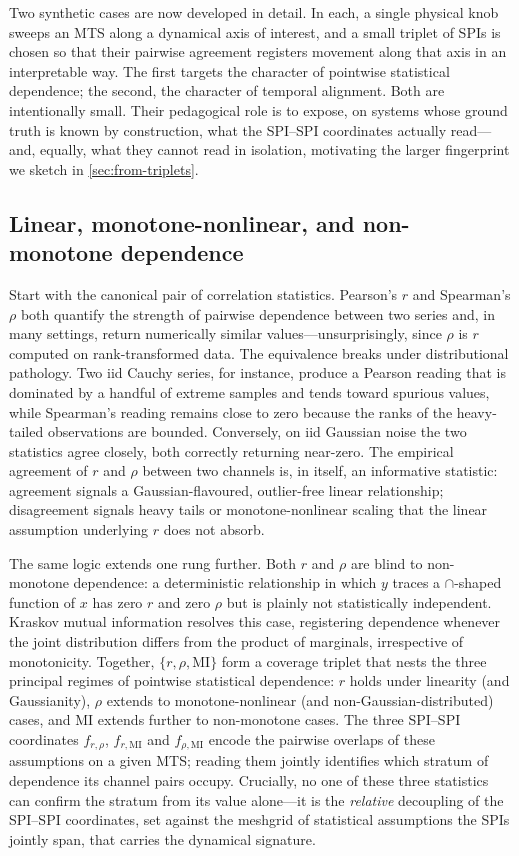 \documentclass{article}
\theoremstyle{plain}
\theoremstyle{definition}
\theoremstyle{remark}
\begin{document}
Two synthetic cases are now developed in detail. In each, a single physical knob sweeps an MTS along a dynamical axis of interest, and a small triplet of SPIs is chosen so that their pairwise agreement registers movement along that axis in an interpretable way. The first targets the character of pointwise statistical dependence; the second, the character of temporal alignment. Both are intentionally small. Their pedagogical role is to expose, on systems whose ground truth is known by construction, what the SPI--SPI coordinates actually read---and, equally, what they cannot read in isolation, motivating the larger fingerprint we sketch in \cref{sec:from-triplets}.

\subsection{Linear, monotone-nonlinear, and non-monotone dependence}
\label{sec:case-rho-mi}

Start with the canonical pair of correlation statistics. Pearson's $r$ and Spearman's $\rho$ both quantify the strength of pairwise dependence between two series and, in many settings, return numerically similar values---unsurprisingly, since $\rho$ is $r$ computed on rank-transformed data. The equivalence breaks under distributional pathology. Two iid Cauchy series, for instance, produce a Pearson reading that is dominated by a handful of extreme samples and tends toward spurious values, while Spearman's reading remains close to zero because the ranks of the heavy-tailed observations are bounded. Conversely, on iid Gaussian noise the two statistics agree closely, both correctly returning near-zero. The empirical agreement of $r$ and $\rho$ between two channels is, in itself, an informative statistic: agreement signals a Gaussian-flavoured, outlier-free linear relationship; disagreement signals heavy tails or monotone-nonlinear scaling that the linear assumption underlying $r$ does not absorb.

The same logic extends one rung further. Both $r$ and $\rho$ are blind to non-monotone dependence: a deterministic relationship in which $y$ traces a $\cap$-shaped function of $x$ has zero $r$ and zero $\rho$ but is plainly not statistically independent. Kraskov mutual information \citep{kraskov2004estimating} resolves this case, registering dependence whenever the joint distribution differs from the product of marginals, irrespective of monotonicity. Together, $\{r,\rho,\mathrm{MI}\}$ form a coverage triplet that nests the three principal regimes of pointwise statistical dependence: $r$ holds under linearity (and Gaussianity), $\rho$ extends to monotone-nonlinear (and non-Gaussian-distributed) cases, and $\mathrm{MI}$ extends further to non-monotone cases. The three SPI--SPI coordinates $f_{r,\rho}$, $f_{r,\mathrm{MI}}$ and $f_{\rho,\mathrm{MI}}$ encode the pairwise overlaps of these assumptions on a given MTS; reading them jointly identifies which stratum of dependence its channel pairs occupy. Crucially, no one of these three statistics can confirm the stratum from its value alone---it is the \emph{relative} decoupling of the SPI--SPI coordinates, set against the meshgrid of statistical assumptions the SPIs jointly span, that carries the dynamical signature.
\end{document}
